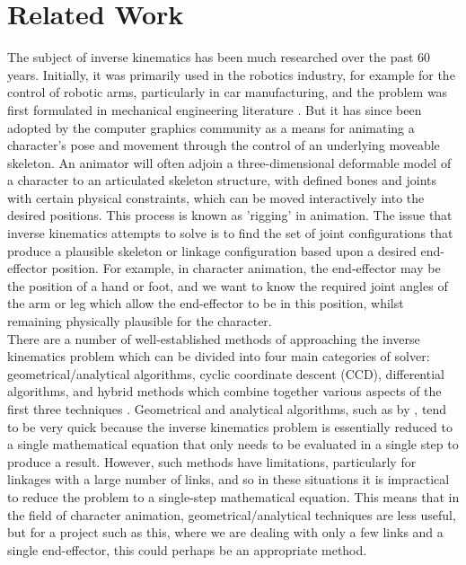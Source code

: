 \documentclass[paper=a4, fontsize=11pt]{scrartcl} %
\numberwithin{equation}{section} %
\numberwithin{figure}{section} %
\numberwithin{table}{section} %
\begin{document}

\section{Related Work}
The subject of inverse kinematics has been much researched over the past 60 years. Initially, it was primarily used in the robotics industry, for example for the control of robotic arms, particularly in car manufacturing, and the problem was first formulated in mechanical engineering literature \cite{Crai55}. But it has since been adopted by the computer graphics community as a means for animating a character's pose and movement through the control of an underlying moveable skeleton. An animator will often adjoin a three-dimensional deformable model of a character to an articulated skeleton structure, with defined bones and joints with certain physical constraints, which can be moved interactively into the desired positions. This process is known as 'rigging' in animation. The issue that inverse kinematics attempts to solve is to find the set of joint configurations that produce a plausible skeleton or linkage configuration based upon a desired end-effector position. For example, in character animation, the end-effector may be the position of a hand or foot, and we want to know the required joint angles of the arm or leg which allow the end-effector to be in this position, whilst remaining physically plausible for the character. \\

There are a number of well-established methods of approaching the inverse kinematics problem which can be divided into four main categories of solver: geometrical/analytical algorithms, cyclic coordinate descent (CCD), differential algorithms, and hybrid methods which combine together various aspects of the first three techniques \cite{Madd04}. Geometrical and analytical algorithms, such as by \cite{Kwan00}, \cite{Chin96} tend to be very quick because the inverse kinematics problem is essentially reduced to a single mathematical equation that only needs to be evaluated in a single step to produce a result. However, such methods have limitations, particularly for linkages with a large number of links, and so in these situations it is impractical to reduce the problem to a single-step mathematical equation. This means that in the field of character animation, geometrical/analytical techniques are less useful, but for a project such as this, where we are dealing with only a few links and a single end-effector, this could perhaps be an appropriate method. \\
\end{document}
